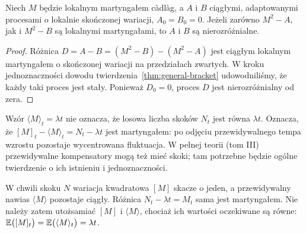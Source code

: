 \begin{lemat}
Niech $M$ będzie lokalnym martyngałem c\`adl\`ag, a $A$ i $B$
ciągłymi, adaptowanymi procesami o lokalnie skończonej wariacji,
$A_0=B_0=0$. Jeżeli zarówno $M^2-A$, jak i $M^2-B$
są lokalnymi martyngałami, to $A$ i $B$ są nierozróżnialne.
\end{lemat}
\begin{proof}
Różnica $D=A-B=(M^2-B)-(M^2-A)$ jest ciągłym
lokalnym martyngałem o skończonej wariacji na przedziałach
zwartych. W kroku jednoznaczności dowodu
twierdzenia~\ref{thm:general-bracket} udowodniliśmy, że
każdy taki proces jest stały. Ponieważ $D_0=0$,
proces $D$ jest nierozróżnialny od zera.
\end{proof}

\begin{uwaga}
Wzór $\langle M\rangle_t=\lambda t$ nie oznacza,
że losowa liczba skoków $N_t$ jest równa $\lambda t$.
Oznacza, że $[M]_t-\langle M\rangle_t=N_t-\lambda t$
jest martyngałem: po odjęciu przewidywalnego tempa
wzrostu pozostaje wycentrowana fluktuacja.
W pełnej teorii (tom III) przewidywalne kompensatory
mogą też mieć skoki; tam potrzebne będzie ogólne
twierdzenie o ich istnieniu i jednoznaczności.
\end{uwaga}


\begin{uwaga}
W chwili skoku $N$ wariacja kwadratowa $[M]$ skacze
o jeden, a przewidywalny nawias $\langle M\rangle$
pozostaje ciągły. Różnica $N_t-\lambda t=M_t$
sama jest martyngałem. Nie należy zatem utożsamiać
$[M]$ i $\langle M\rangle$, chociaż ich wartości
oczekiwane są równe: $\mathbb{E}\bigl([M]_t\bigr)=\mathbb{E}\bigl(\langle M\rangle_t\bigr)=\lambda t$.
\end{uwaga}

